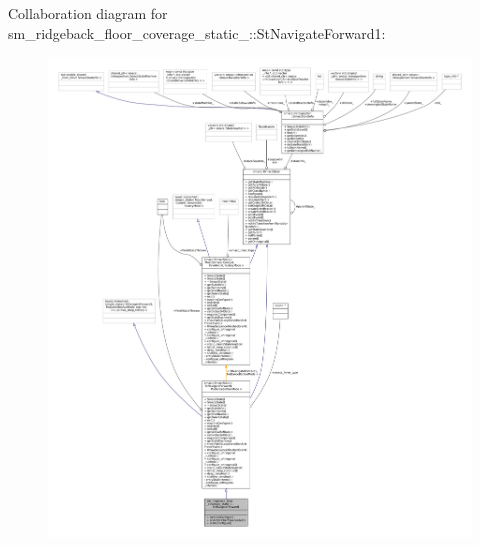 Collaboration diagram for sm\+\_\+ridgeback\+\_\+floor\+\_\+coverage\+\_\+static\+\_\+:\+:St\+Navigate\+Forward1\+:
\nopagebreak
\begin{figure}[H]
\begin{center}
\leavevmode
\includegraphics[width=350pt]{structsm__ridgeback__floor__coverage__static__1_1_1StNavigateForward1__coll__graph}
\end{center}
\end{figure}
